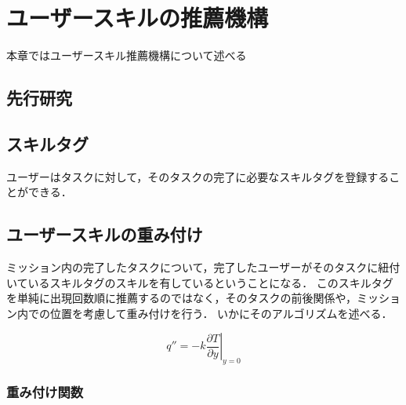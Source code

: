 \chapter{ユーザースキルの推薦機構}
本章ではユーザースキル推薦機構について述べる

\section{先行研究}


\section{スキルタグ}
ユーザーはタスクに対して，そのタスクの完了に必要なスキルタグを登録することができる．

\section{ユーザースキルの重み付け}
ミッション内の完了したタスクについて，完了したユーザーがそのタスクに紐付いているスキルタグのスキルを有しているということになる．
このスキルタグを単純に出現回数順に推薦するのではなく，そのタスクの前後関係や，ミッション内での位置を考慮して重み付けを行う．
いかにそのアルゴリズムを述べる．

\[
 q''=-k\left.\frac{\partial T}{\partial y}\right|_{y=0}
\]

\subsection{重み付け関数}

